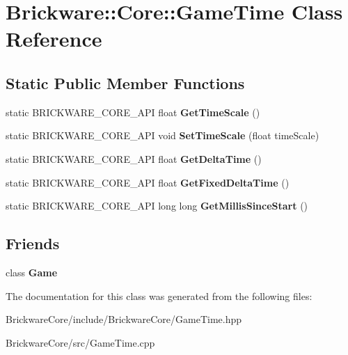 \hypertarget{classBrickware_1_1Core_1_1GameTime}{}\section{Brickware\+:\+:Core\+:\+:Game\+Time Class Reference}
\label{classBrickware_1_1Core_1_1GameTime}
\subsection*{Static Public Member Functions}
\begin{DoxyCompactItemize}
\item 
\hypertarget{classBrickware_1_1Core_1_1GameTime_ab57fc515a4b4a4bb070303bfd5f63331}{}static B\+R\+I\+C\+K\+W\+A\+R\+E\+\_\+\+C\+O\+R\+E\+\_\+\+A\+P\+I float {\bfseries Get\+Time\+Scale} ()\label{classBrickware_1_1Core_1_1GameTime_ab57fc515a4b4a4bb070303bfd5f63331}

\item 
\hypertarget{classBrickware_1_1Core_1_1GameTime_ade2ce3ecee6adaa7f2c4533af2819e7b}{}static B\+R\+I\+C\+K\+W\+A\+R\+E\+\_\+\+C\+O\+R\+E\+\_\+\+A\+P\+I void {\bfseries Set\+Time\+Scale} (float time\+Scale)\label{classBrickware_1_1Core_1_1GameTime_ade2ce3ecee6adaa7f2c4533af2819e7b}

\item 
\hypertarget{classBrickware_1_1Core_1_1GameTime_aa39c56953ae23fa730ac7383365b39d3}{}static B\+R\+I\+C\+K\+W\+A\+R\+E\+\_\+\+C\+O\+R\+E\+\_\+\+A\+P\+I float {\bfseries Get\+Delta\+Time} ()\label{classBrickware_1_1Core_1_1GameTime_aa39c56953ae23fa730ac7383365b39d3}

\item 
\hypertarget{classBrickware_1_1Core_1_1GameTime_a72462bcee897e918f99f1634c448d33e}{}static B\+R\+I\+C\+K\+W\+A\+R\+E\+\_\+\+C\+O\+R\+E\+\_\+\+A\+P\+I float {\bfseries Get\+Fixed\+Delta\+Time} ()\label{classBrickware_1_1Core_1_1GameTime_a72462bcee897e918f99f1634c448d33e}

\item 
\hypertarget{classBrickware_1_1Core_1_1GameTime_ab81db74a12fba3158e16c392c09e449c}{}static B\+R\+I\+C\+K\+W\+A\+R\+E\+\_\+\+C\+O\+R\+E\+\_\+\+A\+P\+I long long {\bfseries Get\+Millis\+Since\+Start} ()\label{classBrickware_1_1Core_1_1GameTime_ab81db74a12fba3158e16c392c09e449c}

\end{DoxyCompactItemize}
\subsection*{Friends}
\begin{DoxyCompactItemize}
\item 
\hypertarget{classBrickware_1_1Core_1_1GameTime_aa2fab026580d6f14280c2ffb8063a314}{}class {\bfseries Game}\label{classBrickware_1_1Core_1_1GameTime_aa2fab026580d6f14280c2ffb8063a314}

\end{DoxyCompactItemize}


The documentation for this class was generated from the following files\+:\begin{DoxyCompactItemize}
\item 
Brickware\+Core/include/\+Brickware\+Core/Game\+Time.\+hpp\item 
Brickware\+Core/src/Game\+Time.\+cpp\end{DoxyCompactItemize}
